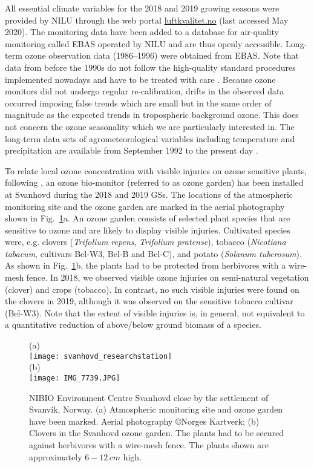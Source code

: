 \documentclass[bg, manuscript]{copernicus}
\begin{document}
All essential climate variables for the 2018 and 2019 growing seasons were provided by NILU through the web portal \href{luftkvalitet.no}{luftkvalitet.no} (last accessed May 2020). The  monitoring data have been added to a database for air-quality monitoring called EBAS operated by NILU and are thus openly accessible. Long-term ozone observation data (1986--1996) were obtained from EBAS. Note that data from before the 1990s do not follow the high-quality standard procedures implemented nowadays and have to be treated with care \citep{NILU2003}. Because ozone monitors did not undergo regular re-calibration, drifts in the observed data occurred imposing false trends which are small but in the same order of magnitude as the expected trends in tropospheric background ozone. This does not concern the ozone seasonality which we are particularly interested in.
The long-term data sets of agrometeorological variables including temperature and precipitation are available from September 1992 to the present day \citep[LandbruksMeteorologiske Tjeneste][note the station name here is Pasvik]{LMT_NIBIO}.

To relate local ozone concentration \chem{[O_3]} with visible injuries on ozone sensitive plants, following \citet{GCB:Mills2011}, an ozone bio-monitor (referred to as ozone garden) has been installed at Svanhovd during the 2018 and 2019 GSs. The locations of the atmospheric monitoring site and the ozone garden are marked in the aerial photography shown in Fig.~\ref{fig:svanhovd_research_station}a. An ozone garden consists of selected plant species that are sensitive to ozone and are likely to display visible injuries. Cultivated species were, e.g. clovers (\emph{Trifolium repens}, \emph{Trifolium pratense}), tobacco (\emph{Nicotiana tabacum}, cultivars Bel-W3, Bel-B and Bel-C), and potato (\emph{Solanum tuberosum}). As shown in Fig.~\ref{fig:svanhovd_research_station}b, the plants had to be protected from herbivores with a wire-mesh fence. In 2018, we observed visible ozone injuries on semi-natural vegetation (clover) and crops (tobacco). In contrast, no such visible injuries were found on the clovers in 2019, although it was observed on the sensitive tobacco cultivar (Bel-W3). Note that the extent of visible injuries is, in general, not equivalent to a quantitative reduction of above/below ground biomass of a species.

\begin{figure}[t]
  \centering
  (a)\\
  \texttt{[image: svanhovd\_researchstation]}\\
  (b)\\
  \texttt{[image: IMG\_7739.JPG]}
  \caption{NIBIO Environment Centre Svanhovd close by the settlement of Svanvik, Norway. (a) Atmospheric monitoring site and ozone garden have been marked. Aerial photography \copyright Norges Kartverk; (b) Clovers in the Svanhovd ozone garden. The plants had to be secured against herbivores with a wire-mesh fence. The plants shown are approximately $6-12\,\unit{cm}$ high.}
  \label{fig:svanhovd_research_station}
\end{figure}
\end{document}
